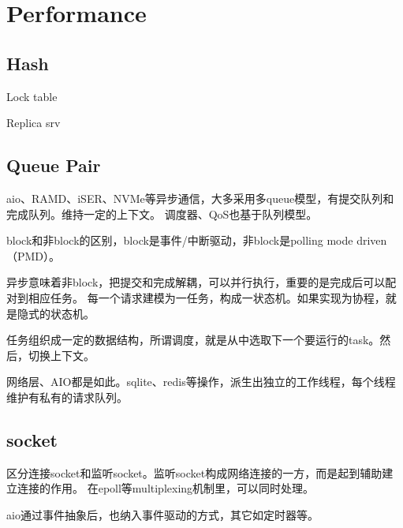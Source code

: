 \section{Performance}

\subsection{Hash}

\begin{enumbox}
\item Lock table
\item Replica srv
\end{enumbox}

\subsection{Queue Pair}

aio、RAMD、iSER、NVMe等异步通信，大多采用多queue模型，有提交队列和完成队列。维持一定的上下文。
调度器、QoS也基于队列模型。

block和非block的区别，block是事件/中断驱动，非block是polling mode driven（PMD）。

异步意味着非block，把提交和完成解耦，可以并行执行，重要的是完成后可以配对到相应任务。
每一个请求建模为一任务，构成一状态机。如果实现为协程，就是隐式的状态机。

任务组织成一定的数据结构，所谓调度，就是从中选取下一个要运行的task。然后，切换上下文。

网络层、AIO都是如此。sqlite、redis等操作，派生出独立的工作线程，每个线程维护有私有的请求队列。

\subsection{socket}

区分连接socket和监听socket。监听socket构成网络连接的一方，而是起到辅助建立连接的作用。
在epoll等multiplexing机制里，可以同时处理。

aio通过事件抽象后，也纳入事件驱动的方式，其它如定时器等。
